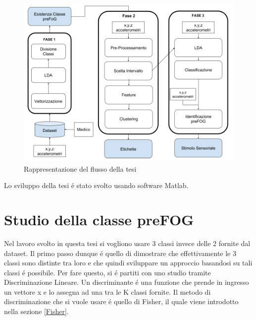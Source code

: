 \begin{figure}[]
	\centering
	\includegraphics[width=1\textwidth]{images/FlussoTesi.png}
	\caption{Rappresentazione del flusso della tesi}
	\label{FlussoTesi}
\end{figure}
Lo sviluppo della tesi é stato svolto usando software Matlab.

\section{Studio della classe preFOG}
Nel lavoro svolto in questa tesi si vogliono usare 3 classi invece delle 2 fornite dal dataset. Il primo passo dunque é quello di dimostrare che effettivamente le 3 classi sono distinte tra loro e che quindi sviluppare un approccio basandosi su tali classi é possibile. Per fare questo, si é partiti con uno studio tramite Discriminazione Lineare. Un discriminante é una funzione che prende in ingresso un vettore x e lo assegna ad una tra le K classi fornite. Il metodo di discriminazione che si vuole usare é quello di Fisher, il quale viene introdotto nella sezione \ref{Fisher}.\\
